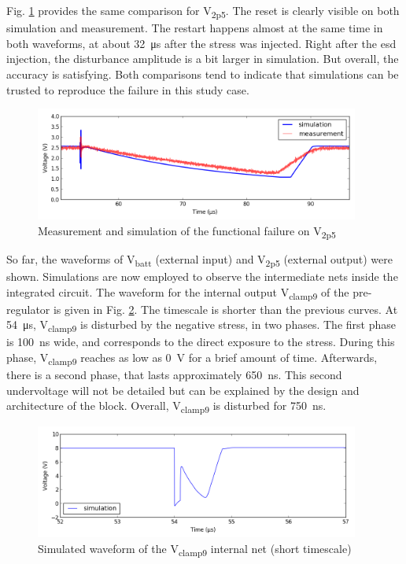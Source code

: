 Fig. \ref{fig:wvf-v2p5} provides the same comparison for V\textsubscript{2p5}.
The reset is clearly visible on both simulation and measurement.
The restart happens almost at the same time in both waveforms, at about \SI{32}{\micro\second} after the stress was injected.
Right after the \gls{esd} injection, the disturbance amplitude is a bit larger in simulation.
But overall, the accuracy is satisfying.
Both comparisons tend to indicate that simulations can be trusted to reproduce the failure in this study case.

\begin{figure}[!h]
  \centering
  \includegraphics[width=0.95\textwidth]{src/3/figures/v2p5.png}
  \caption{Measurement and simulation of the functional failure on V\textsubscript{2p5}}
  \label{fig:wvf-v2p5}
\end{figure}

So far, the waveforms of V\textsubscript{batt} (external input) and V\textsubscript{2p5} (external output) were shown.
Simulations are now employed to observe the intermediate nets inside the integrated circuit.
The waveform for the internal output V\textsubscript{clamp9} of the pre-regulator is given in Fig. \ref{fig:wvf-vclamp9}.
The timescale is shorter than the previous curves.
At \SI{54}{\micro\second},  V\textsubscript{clamp9} is disturbed by the negative stress, in two phases.
The first phase is \SI{100}{\nano\second} wide, and corresponds to the direct exposure to the stress.
During this phase, V\textsubscript{clamp9} reaches as low as \SI{0}{\volt} for a brief amount of time.
Afterwards, there is a second phase, that lasts approximately \SI{650}{\nano\second}.
This second undervoltage will not be detailed but can be explained by the design and architecture of the block.
Overall, V\textsubscript{clamp9} is disturbed for \SI{750}{\nano\second}.

\begin{figure}[!h]
  \centering
  \includegraphics[width=0.95\textwidth]{src/3/figures/vclamp9.png}
  \caption{Simulated waveform of the V\textsubscript{clamp9} internal net (short timescale)}
  \label{fig:wvf-vclamp9}
\end{figure}

